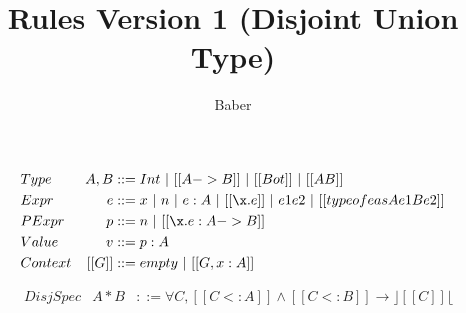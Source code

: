 \documentclass[a4paper]{article}
\title{Rules Version 1 (Disjoint Union Type)}
\author{Baber}
\begin{document}
\maketitle

\begin{align*}
&Type &A, B&::= Int ~|~ [[A->B]]~ | ~[[Bot]]~ |~ [[A \/ B]]\\
&Expr &e &::= x ~|~ n ~|~ e:A ~|~[[\x.e]] ~ | ~ e1e2 ~|~ [[typeof e as A e1 B e2]]\\
&PExpr & p &::= n ~|~ [[\x.e : A->B]] \\
&Value &v &::= p : A \\
&Context & [[G]] &::= empty~ |~ [[G , x : A]]
\end{align*}

\begin{align*}
&DisjSpec & A * B & ::= \forall C, [[C <: A]] \wedge [[C <: B]] \rightarrow  \rfloor [[C]] \lfloor
\end{align*}

\bigskip

\ottdefnsBottomLike

\ottdefnsDisjointness

\ottdefnsSubtyping

\ottdefnsTyping

\ottdefnsReduction
\end{document}
